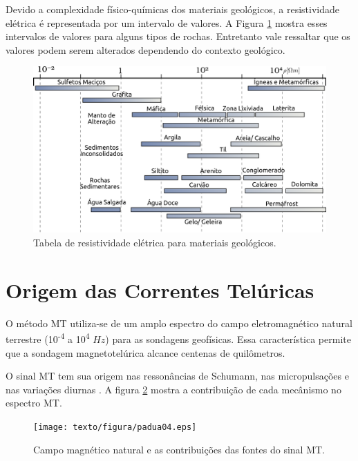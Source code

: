         Devido a complexidade físico-químicas dos materiais geológicos, a resistividade elétrica é representada por um intervalo de valores. A Figura \ref{tabela-resis} mostra esses intervalos de valores para alguns tipos de rochas. Entretanto vale ressaltar que os valores podem serem alterados dependendo do contexto geológico. 
        
        \begin{figure}[H]
            \caption{Tabela de resistividade elétrica para materiais geológicos.}
                \begin{center}
                    \includegraphics[width=13cm]{texto/figura/resistividade_tabela.png}
                \end{center}
            \label{tabela-resis}
        \end{figure}
    
    \section{Origem das Correntes Telúricas}
    
        O método MT utiliza-se de um amplo espectro do campo eletromagnético natural terrestre (10\textsuperscript{-4} a 10\textsuperscript{4} $Hz$) para as sondagens geofísicas. Essa característica permite que  a sondagem magnetotelúrica alcance centenas de quilômetros.
        
        O sinal MT tem sua origem nas ressonâncias de Schumann, nas micropulsações e nas variações diurnas \cite{padua2004estudos}. A figura \ref{sinalmt} mostra a contribuição de cada mecânismo no espectro MT.
        
        \begin{figure}[H]
            \caption{Campo magnético natural e as contribuições das fontes do sinal MT.}
                \begin{center}
                    \texttt{[image: texto/figura/padua04.eps]}
                \end{center}
            \label{sinalmt}
        \end{figure}
        
